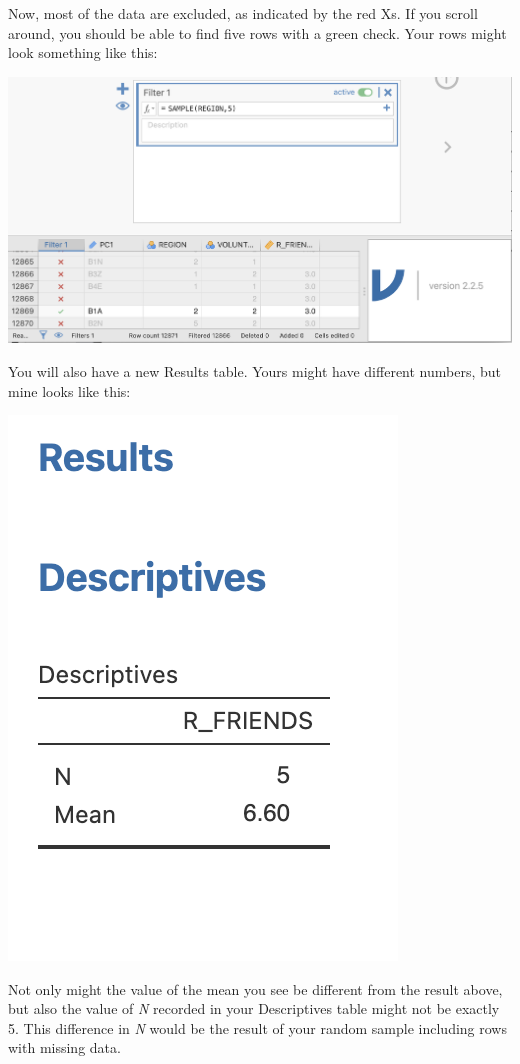 \documentclass[
]{book}
\begin{document}
Now, most of the data are excluded, as indicated by the red Xs. If you scroll around, you should be able to find five rows with a green check. Your rows might look something like this:

\includegraphics{img/Filters_redX.png}

You will also have a new Results table. Yours might have different numbers, but mine looks like this:

\includegraphics{img/ResultsN5.png}

Not only might the value of the mean you see be different from the result above, but also the value of \emph{N} recorded in your Descriptives table might not be exactly 5. This difference in \emph{N} would be the result of your random sample including rows with missing data.
\end{document}

